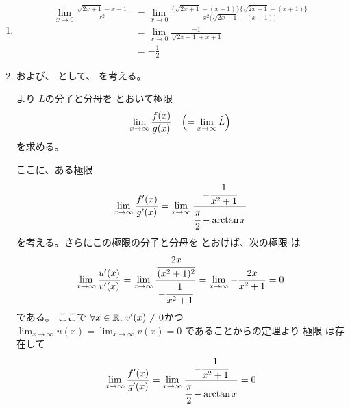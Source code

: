 \begin{ans*}
  ${}$
  \begin{enumerate}[label=(\arabic*)]
    \item
    \begin{align}
      \lim_{x\to 0}\frac{\sqrt{2x+1} - x - 1}{x^2}
      &= \lim_{x\to 0}\frac{\bigl\{ \sqrt{2x+1} - (x+1) \bigr\}\bigl\{ \sqrt{2x+1} + (x+1) \bigr\}}{x^2\bigl( \sqrt{2x+1} + (x+1) \bigr)} \\
      &= \lim_{x\to 0}\frac{-1}{\sqrt{2x+1} + x + 1} \\
      &= - \frac{1}{2}
    \end{align}

    \item
    および、
    として、
    を考える。

    より
    $L$の分子と分母を
    とおいて極限
    \begin{gather}
      \lim_{x\to\infty}\frac{f(x)}{g(x)} \quad\Bigl(= \lim_{x\to\infty} \hat{L}\Bigr)
    \end{gather}
    を求める。

    ここに、ある極限
    \begin{gather}
      \lim_{x\to\infty}\frac{f'(x)}{g'(x)}
      =\lim_{x\to\infty}\frac{-\cfrac{1}{x^2+1}}{\cfrac{\pi}{2}-\arctan x}
    \end{gather}
    を考える。さらにこの極限の分子と分母を
    とおけば、次の極限
    は
    \begin{align}
      \lim_{x\to\infty}\frac{u'(x)}{v'(x)}
      = \lim_{x\to\infty} \frac{\cfrac{2x}{(x^2+1)^2}}{-\cfrac{1}{x^2+1}}
      = \lim_{x\to\infty} -\frac{2x}{x^2+1}
      = 0
    \end{align}
    である。
    ここで
    $\displaystyle\forall x\in\mathbb{R},\,\displaystyle v'(x)\neq 0$かつ$ \lim_{x\to\infty}u(x) = \lim_{x\to\infty}v(x) = 0$
    であることから\lhopital の定理より
    極限
    は存在して
    \begin{gather}
      \lim_{x\to\infty}\frac{f'(x)}{g'(x)}
      = \lim_{x\to\infty}\frac{-\cfrac{1}{x^2+1}}{\cfrac{\pi}{2}-\arctan x}
      = 0
    \end{gather}


\end{enumerate}
\end{ans*}
